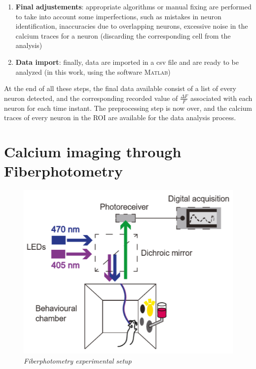 \documentclass[12pt, a4paper]{report}
\begin{document}
\begin{enumerate}
	\item \textbf{Final adjustements}: appropriate algorithms or manual fixing are performed to take into account some imperfections, such as mistakes in neuron identification, inaccuracies due to overlapping neurons, excessive noise in the calcium traces for a neuron (discarding the corresponding cell from the analysis)
	
	\item \textbf{Data import}: finally, data are imported in a csv file and are ready to be analyzed (in this work, using the software \textsc{Matlab})
	
\end{enumerate} 


At the end of all these steps, the final data available consist of a list of every neuron detected, and the corresponding recorded value of $\frac{\Delta F }{F}$ associated  with each neuron for each time instant. The preprocessing step is now over, and the calcium traces of every neuron in the ROI are available for the data analysis process.	


\newpage
\section{Calcium imaging through Fiberphotometry} \label{section 1.4}

\begin{figure}[H]
	\begin{center}
		\includegraphics[scale=.55]{fiberphotometry.png} 
	\end{center} 
	\caption{\textit{Fiberphotometry experimental setup}}
	\label{fiberphotometry}
\end{figure}
\end{document}

